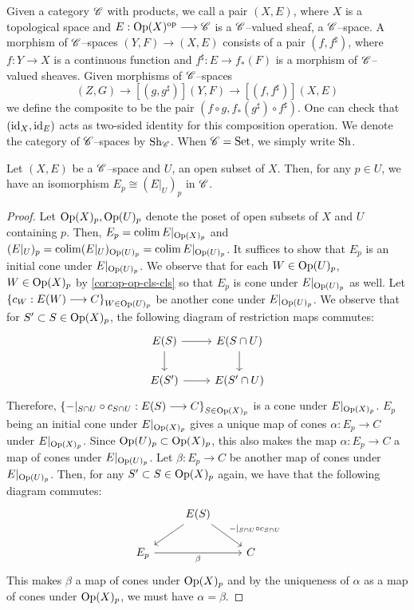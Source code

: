 \begin{defn}\label{defn:Set-space}
Given a category $\mathscr{C}$ with products,
we call a pair $(X, E)$, where $X$ is a topological space and
$E : \Op(X)^\op \to \sC$ is a $\mathscr{C}$--valued sheaf, a $\mathscr{C}$--space.
A morphism of $\mathscr{C}$--spaces $(Y, F) \to (X, E)$ consists of a pair
$(f, f^\sharp)$, where $f : Y \to X$ is a continuous function
and $f^\sharp : E \to f_*(F)$ is a morphism of $\mathscr{C}$--valued
sheaves. Given morphisms of $\mathscr{C}$--spaces
\[
(Z, G) \to[{(g, g^\sharp)}] (Y, F) \to[{(f, f^\sharp)}] (X, E)
\]
we define the composite to be the pair
$(f \circ g, f_*(g^\sharp) \circ f^\sharp)$.
One can check that $(\mathrm{id}_X, \mathrm{id}_{E})$ acts as two-sided identity
for this composition operation.
We denote
the category of $\mathscr{C}$--spaces by $\mathrm{Sh}_\mathscr{C}$. When $\mathscr{C} = \mathrm{Set}$,
we simply write $\mathrm{Sh}$.
\end{defn}

\begin{lem}\label{lem:stalk-open-subset}
Let $(X, E)$ be a $\mathscr{C}$--space and $U$, an open subset of $X$.
Then, for any $p \in U$, we have an isomorphism
$E_p \cong (E|_U)_p$ in $\mathscr{C}$.
\end{lem}
\begin{proof}
Let $\mathrm{Op}(X)_p, \mathrm{Op}(U)_p$ denote the poset of open subsets of $X$ and $U$
containing $p$. Then, $E_p = \operatorname{\mathrm{colim}} E|_{\mathrm{Op}(X)_p}$
and $(E|_U)_p = \operatorname{\mathrm{colim}} (E|_U)_{\mathrm{Op}(U)_p} = \operatorname{\mathrm{colim}} E|_{\mathrm{Op}(U)_p}$.
It suffices to show that $E_p$ is an initial cone under
$E|_{\mathrm{Op}(U)_p}$. We observe that for each $W \in \mathrm{Op}(U)_p$,
$W \in \mathrm{Op}(X)_p$ by \cref{cor:op-op-cls-cls} so that $E_p$
is cone under $E|_{\mathrm{Op}(U)_p}$ as well.
Let $\set{c_W : E(W) \to C}_{W \in \Op(U)_p}$ be another cone under
$E|_{\mathrm{Op}(U)_p}$.
We observe that for $S' \subset S \in \mathrm{Op}(X)_p$, the following diagram of
restriction maps commutes:
\[\begin{tikzcd}
E(S) \ar[r] \ar[d] & E(S \cap U) \ar[d] \\
E(S') \ar[r] & E(S' \cap U)
\end{tikzcd}\]
Therefore,
$\set{-|_{S \cap U} \circ c_{S \cap U} : E(S) \to C}_{S \in \Op(X)_p}$
is a cone under $E|_{\mathrm{Op}(X)_p}$.
$E_p$ being an initial cone under $E|_{\mathrm{Op}(X)_p}$ gives
a unique map of cones $\alpha : E_p \to C$ under $E|_{\mathrm{Op}(X)_p}$.
Since $\mathrm{Op}(U)_p \subset \mathrm{Op}(X)_p$, this also makes
the map $\alpha : E_p \to C$ a map of cones under $E|_{\mathrm{Op}(U)_p}$.
Let $\beta : E_p \to C$ be another map of cones under $E|_{\mathrm{Op}(U)_p}$.
Then, for any $S' \subset S \in \mathrm{Op}(X)_p$ again, we have that the following
diagram commutes:
\[\begin{tikzcd}
& E(S) \ar[ld] \ar[rd, "-|_{S \cap U} \circ c_{S \cap U}"] & \\
E_p \ar[rr, "\beta" below ]& & C
\end{tikzcd}\]
This makes $\beta$ a map of cones under $\mathrm{Op}(X)_p$ and by the uniqueness
of $\alpha$ as a map of cones under $\mathrm{Op}(X)_p$, we must have
$\alpha = \beta$.
\end{proof}

